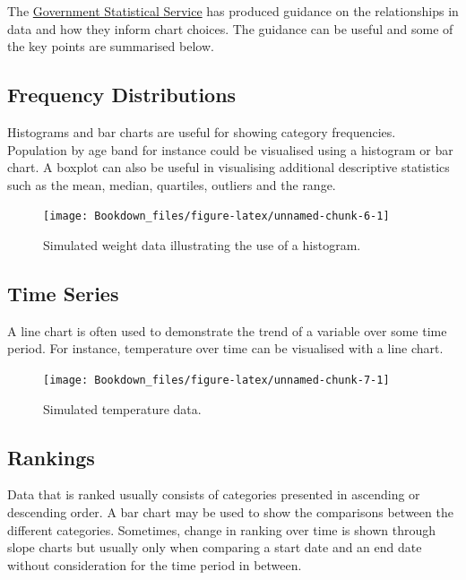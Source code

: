 \documentclass[
]{book}
\begin{document}
The \href{https://analysisfunction.civilservice.gov.uk/policy-store/data-visualisation-charts/\#section-9}{Government Statistical Service} has produced guidance on the relationships in data and how they inform chart choices. The guidance can be useful and some of the key points are summarised below.

\hypertarget{frequency-distributions}{%
\subsection{Frequency Distributions}\label{frequency-distributions}}

Histograms and bar charts are useful for showing category frequencies. Population by age band for instance could be visualised using a histogram or bar chart. A boxplot can also be useful in visualising additional descriptive statistics such as the mean, median, quartiles, outliers and the range.

\begin{figure}

{\centering \texttt{[image: Bookdown\_files/figure-latex/unnamed-chunk-6-1]} 

}

\caption{Simulated weight data illustrating the use of a histogram.}\label{fig:unnamed-chunk-6}
\end{figure}

\hypertarget{time-series}{%
\subsection{Time Series}\label{time-series}}

A line chart is often used to demonstrate the trend of a variable over some time period. For instance, temperature over time can be visualised with a line chart.

\begin{figure}

{\centering \texttt{[image: Bookdown\_files/figure-latex/unnamed-chunk-7-1]} 

}

\caption{Simulated temperature data.}\label{fig:unnamed-chunk-7}
\end{figure}

\hypertarget{rankings}{%
\subsection{Rankings}\label{rankings}}

Data that is ranked usually consists of categories presented in ascending or descending order. A bar chart may be used to show the comparisons between the different categories. Sometimes, change in ranking over time is shown through slope charts but usually only when comparing a start date and an end date without consideration for the time period in between.
\end{document}
